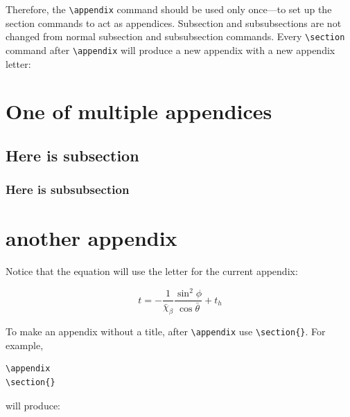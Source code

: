 \documentclass[preprint]{JASA}
\begin{document}
Therefore, the \verb+\appendix+ command
should be used only once---to set up the section commands to act as
appendices. Subsection and subsubsections are not changed from normal subsection
and subsubsection commands.
\newpage
{}
Every \verb+\section+ command after \verb+\appendix+ will produce a new appendix with 
a new appendix letter:

\appendix
\section{One of multiple appendices}
\subsection{Here is subsection}
\subsubsection{Here is subsubsection}


\section{another appendix}
Notice that the equation will use the letter for the current appendix:

\begin{equation}
t=-\frac{1}{\bar{\chi}_\beta}\frac{\sin^2\phi}{\cos\bar\theta}+t_h
\end{equation}

To make an appendix without a title, after \verb+\appendix+ use \verb+\section{}+. For example,

\begin{verbatim}
\appendix
\section{}
\end{verbatim}
will produce:

\appendix
\section{}
\end{document}
